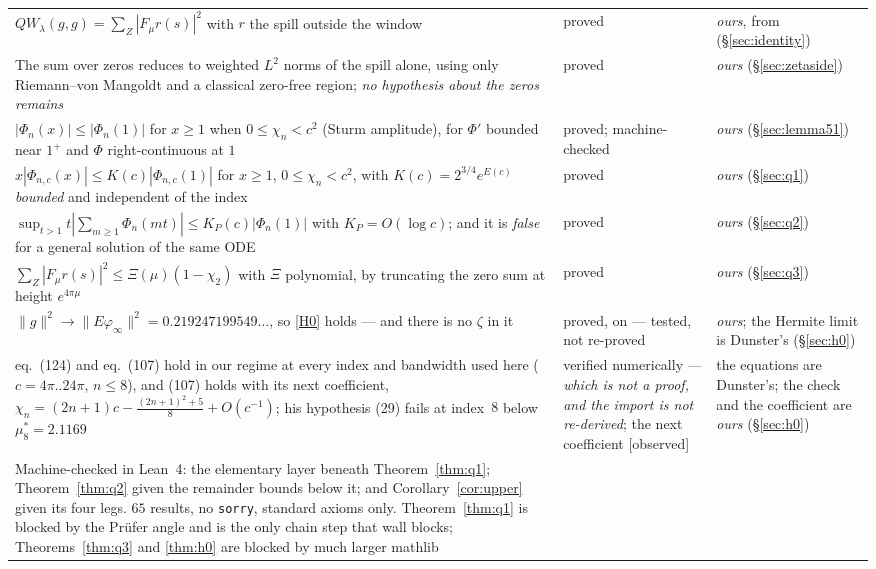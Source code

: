 \documentclass[11pt,a4paper]{article}
\theoremstyle{plain}
\theoremstyle{definition}
\theoremstyle{remark}
\newcommand{\st}[1]{{\normalfont\sffamily\footnotesize[#1]}}
\newcommand{\observed}{\st{observed}}
\newcommand{\R}{\mathbb{R}}
\newcommand{\Z}{\mathbb{Z}}
\newcommand{\Q}{\mathbb{Q}}
\newcommand{\A}{\mathbb{A}}
\newcommand{\E}{\mathcal{E}}
\newcommand{\F}{\mathcal{F}}
\newcommand{\QW}{QW}
\def\QW{QW}\def\E{E}\def\F{F}\def\R{R}\def\Q{Q}\def\Z{Z}\def\A{A}%
\begin{document}
\begin{center}
\begin{tabular}{@{}p{}p{}p{}@{}}
$\QW_\lambda(g,g)=\sum_{Z}|\F_\mu r(s)|^2$ with $r$ the spill outside the window
& proved & \emph{ours}, from \cite{CC2023} (\S\ref{sec:identity}) \\
The sum over zeros reduces to weighted $L^2$ norms of the spill alone, using
only Riemann--von Mangoldt and a classical zero-free region; \emph{no hypothesis
about the zeros remains}
& proved & \emph{ours} (\S\ref{sec:zetaside}) \\
$|\Phi_n(x)|\le|\Phi_n(1)|$ for $x\ge1$ when $0\le\chi_n<c^2$ (Sturm amplitude),
for $\Phi'$ bounded near $1^+$ and $\Phi$ right-continuous at $1$
& proved; machine-checked & \emph{ours} (\S\ref{sec:lemma51}) \\
$x|\Phi_{n,c}(x)|\le K(c)|\Phi_{n,c}(1)|$ for $x\ge1$, $0\le\chi_n<c^2$, with
$K(c)=2^{3/4}e^{E(c)}$ \emph{bounded} and independent of the index
& proved & \emph{ours} (\S\ref{sec:q1}) \\
$\sup_{t>1}t|\sum_{m\ge1}\Phi_n(mt)|\le K_P(c)|\Phi_n(1)|$ with
$K_P=O(\log c)$; and it is \emph{false} for a general solution of the same ODE
& proved & \emph{ours} (\S\ref{sec:q2}) \\
$\sum_Z|\F_\mu r(s)|^2\le\Xi(\mu)(1-\chi_2)$ with $\Xi$ polynomial, by
truncating the zero sum at height $e^{4\pi\mu}$
& proved & \emph{ours} (\S\ref{sec:q3}) \\
$\|g\|^2\to\|\E\varphi_\infty\|^2=0.219247199549\ldots$, so \eqref{H0} holds ---
and there is no $\zeta$ in it
& proved, on \cite{Dunster2017} --- tested, not re-proved
& \emph{ours}; the Hermite limit is Dunster's
(\S\ref{sec:h0}) \\
\cite{Dunster2017} eq.\ (124) and eq.\ (107) hold in our regime at every index
and bandwidth used here ($c=4\pi..24\pi$, $n\le8$), and (107) holds with its
next coefficient, $\chi_n=(2n+1)c-\frac{(2n+1)^2+5}{8}+O(c^{-1})$; his
hypothesis (29) fails at index~$8$ below $\mu^*_8=2.1169$
& verified numerically --- \emph{which is not a proof, and the import is not
re-derived}; the next coefficient \observed{} & the equations are Dunster's;
the check and the coefficient are \emph{ours} (\S\ref{sec:h0}) \\
Machine-checked in Lean~4: the elementary layer beneath
Theorem~\ref{thm:q1}; Theorem~\ref{thm:q2} given the remainder bounds below it;
and Corollary~\ref{cor:upper} given its four legs.  $65$ results, no
\texttt{sorry}, standard axioms only.  Theorem~\ref{thm:q1} is blocked by the
Pr\"ufer angle and is the only chain step that wall blocks;
Theorems~\ref{thm:q3} and \ref{thm:h0} are blocked by much larger mathlib

\end{tabular}
\end{center}
\end{document}
